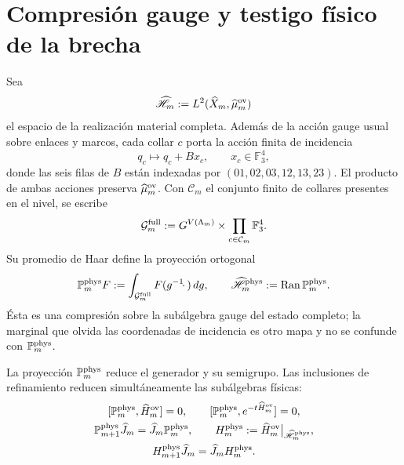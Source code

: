 \section*{Compresión gauge y testigo físico de la brecha}

Sea
\[
 \widehat{\mathscr H}_m
 :=L^2(\widehat X_m,\widehat\mu_m^{\rm ov})
\]
el espacio de la realización material completa. Además de la acción gauge
usual sobre enlaces y marcos, cada collar \(c\) porta la acción finita de
incidencia
\begin{equation}\label{eq:amp-ym-accion-gauge-incidencia}
 q_c\longmapsto q_c+Bx_c,
 \qquad x_c\in\mathbb F_3^4,
\end{equation}
donde las seis filas de \(B\) están indexadas por
\((01,02,03,12,13,23)\). El producto de ambas acciones preserva
\(\widehat\mu_m^{\rm ov}\). Con \(\mathcal C_m\) el conjunto finito de
collares presentes en el nivel, se escribe
\[
 \mathcal G_m^{\rm full}
 :=G^{V(\Lambda_m)}
   \times\prod_{c\in\mathcal C_m}\mathbb F_3^4.
\]
Su promedio de Haar define la proyección
ortogonal
\begin{equation}\label{eq:amp-ym-proyeccion-fisica-haar}
 \mathbb P_m^{\rm phys}F
 :=\int_{\mathcal G_m^{\rm full}}F(g^{-1}\!\cdot\,)\,dg,
 \qquad
 \widehat{\mathscr H}_m^{\rm phys}
 :=\operatorname{Ran}\mathbb P_m^{\rm phys}.
\end{equation}
Ésta es una compresión sobre la subálgebra gauge del estado completo; la
marginal que olvida las coordenadas de incidencia es otro mapa y no se
confunde con \(\mathbb P_m^{\rm phys}\).

\begin{lemma}
\label{lem:amp-ym-compresion-fisica}
La proyección \(\mathbb P_m^{\rm phys}\) reduce el generador y su
semigrupo. Las inclusiones de refinamiento reducen simultáneamente las
subálgebras físicas:
\begin{equation}\label{eq:amp-ym-compresion-entrelazada}
 \begin{gathered}
 [\mathbb P_m^{\rm phys},\widehat H_m^{\rm ov}]=0,
 \qquad
 [\mathbb P_m^{\rm phys},e^{-t\widehat H_m^{\rm ov}}]=0,\\
 \mathbb P_{m+1}^{\rm phys}\widehat J_m
 =\widehat J_m\mathbb P_m^{\rm phys},\qquad
 H_m^{\rm phys}
 :=\widehat H_m^{\rm ov}\big|_{\widehat{\mathscr H}_m^{\rm phys}},\\
 H_{m+1}^{\rm phys}\widehat J_m
 =\widehat J_mH_m^{\rm phys}.
 \end{gathered}
\end{equation}
\end{lemma}

